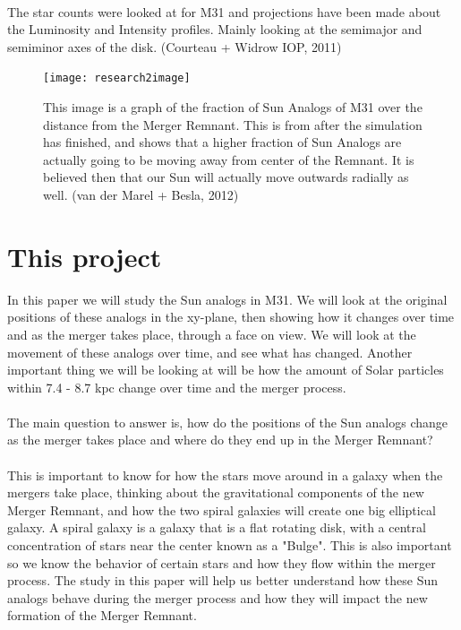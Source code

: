 \documentclass[fleqn,usenatbib]{mnras}
\begin{document}
\paragraph{}
The star counts were looked at for M31 and projections have been made about the Luminosity and Intensity profiles. Mainly looking at the semimajor and semiminor axes of the disk. (Courteau + Widrow IOP, 2011)
\begin{figure}
\graphicspath{ {/home/} }
\texttt{[image: research2image]}
\caption{This image is a graph of the fraction of Sun Analogs of M31 over the distance from the Merger Remnant. This is from after the simulation has finished, and shows that a higher fraction of Sun Analogs are actually going to be moving away from center of the Remnant. It is believed then that our Sun will actually move outwards radially as well. (van der Marel + Besla, 2012)
}
\end{figure}



\section{This project}

In this paper we will study the Sun analogs in M31. We will look at the original positions of these analogs in the xy-plane, then showing how it changes over time and as the merger takes place, through a face on view. We will look at the movement of these analogs over time, and see what has changed. Another important thing we will be looking at will be how the amount of Solar particles within 7.4 - 8.7 kpc change over time and the merger process.
\paragraph{}
The main question to answer is, how do the positions of the Sun analogs change as the merger takes place and where do they end up in the Merger Remnant?
\paragraph{}
This is important to know for how the stars move around in a galaxy when the mergers take place, thinking about the gravitational components of the new Merger Remnant, and how the two spiral galaxies will create one big elliptical galaxy. A spiral galaxy is a galaxy that is a flat rotating disk, with a central concentration of stars near the center known as a "Bulge". This is also important so we know the behavior of certain stars and how they flow within the merger process. The study in this paper will help us better understand how these Sun analogs behave during the merger process and how they will impact the new formation of the Merger Remnant. 
\end{document}

